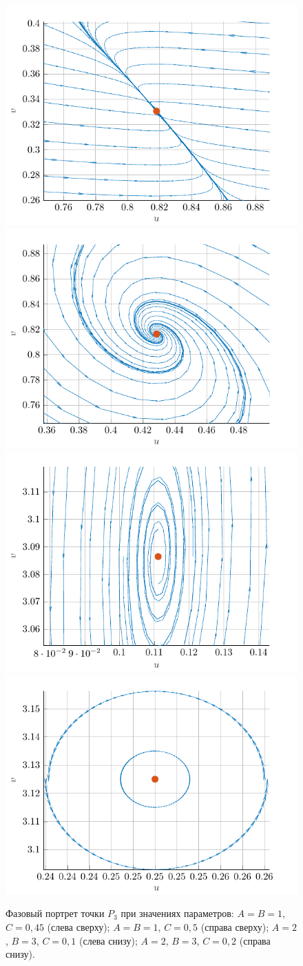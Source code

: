 \documentclass[a4paper, 11pt]{article}
\begin{document}
	\begin{figure}[t]
		\centering
		\includegraphics[width=0.45\linewidth]{schema/p3_1.schema.pdf}
		\includegraphics[width=0.45\linewidth]{schema/p3_2.schema.pdf}
		\includegraphics[width=0.45\linewidth]{schema/p3_3.schema.pdf}
		\includegraphics[width=0.45\linewidth]{schema/p3_4.schema.pdf}
		\caption{Фазовый портрет точки $P_3$ при значениях параметров: $A=B=1$, $C=0,\!45$ (слева сверху); $A = B = 1$, $C = 0,\!5$ (справа сверху); $A = 2$, $B = 3$, $C = 0,\!1$ (слева снизу); $A = 2$, $B = 3$, $C = 0,\!2$ (справа снизу).}
	\end{figure}
\end{document}
